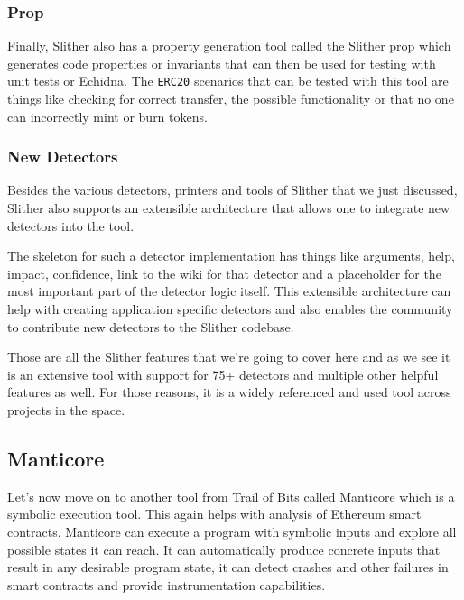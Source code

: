 \subsubsection{Prop}\label{prop}

Finally, Slither also has a property generation tool called the Slither
prop which generates code properties or invariants that can then be used
for testing with unit tests or Echidna. The \texttt{ERC20} scenarios
that can be tested with this tool are things like checking for correct
transfer, the possible functionality or that no one can incorrectly mint
or burn tokens.

\subsubsection{New Detectors}\label{new-detectors}

Besides the various detectors, printers and tools of Slither that we
just discussed, Slither also supports an extensible architecture that
allows one to integrate new detectors into the tool.

The skeleton for such a detector implementation has things like
arguments, help, impact, confidence, link to the wiki for that detector
and a placeholder for the most important part of the detector logic
itself. This extensible architecture can help with creating application
specific detectors and also enables the community to contribute new
detectors to the Slither codebase.

Those are all the Slither features that we're going to cover here and as
we see it is an extensive tool with support for 75+ detectors and
multiple other helpful features as well. For those reasons, it is a
widely referenced and used tool across projects in the space.

\subsection{Manticore}\label{manticore}

Let's now move on to another tool from Trail of Bits called Manticore
which is a symbolic execution tool. This again helps with analysis of
Ethereum smart contracts. Manticore can execute a program with symbolic
inputs and explore all possible states it can reach. It can
automatically produce concrete inputs that result in any desirable
program state, it can detect crashes and other failures in smart
contracts and provide instrumentation capabilities.

